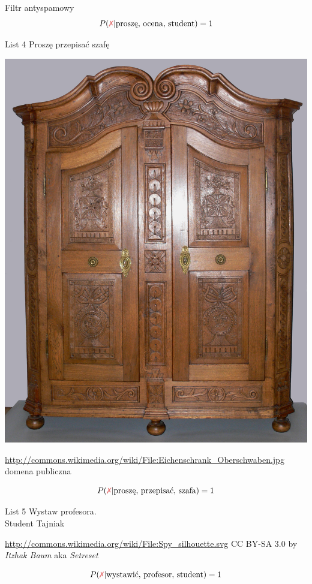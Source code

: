 \documentclass{beamer}
\newcommand{\xmark}{\textcolor{red!80!black!50}{\text{\ding{55}}}}
\begin{document}
\begin{frame}{Filtr antyspamowy}
{\[ P(\xmark | \text{proszę, ocena, student})=1 \]
}
{
	\begin{minipage}{.50\textwidth}
\begin{block}{List 4}
Proszę przepisać szafę
\end{block}
\end{minipage}
\hfill
\begin{minipage}{.45\textwidth}
\begin{centering}
\includegraphics[height=.5\textheight]{bayes/Eichenschrank_Oberschwaben.jpg}\\
\end{centering}
{\tiny \url{http://commons.wikimedia.org/wiki/File:Eichenschrank_Oberschwaben.jpg} domena publiczna}
\end{minipage}
\[ P(\xmark | \text{proszę, przepisać, szafa})=1 \]
}
{
	\begin{minipage}{.50\textwidth}
\begin{block}{List 5}
Wystaw profesora.\\
Student Tajniak
\end{block}
\end{minipage}
\hfill
\begin{minipage}{.45\textwidth}
\begin{centering}
\def\svgwidth{\textwidth}

\end{centering}
{\tiny \url{http://commons.wikimedia.org/wiki/File:Spy_silhouette.svg} CC BY-SA 3.0 by \emph{Itzhak Baum} aka \emph{Setreset}}
\end{minipage}
\[ P(\xmark | \text{wystawić, profesor, student})=1 \]
}


\end{frame}
\end{document}
